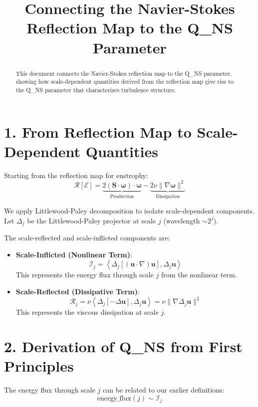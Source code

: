 \documentclass[11pt]{article}
\title{Connecting the Navier-Stokes Reflection Map to the Q_{NS} Parameter}
\author{}
\date{}
\begin{document}
\maketitle
\begin{abstract}
This document connects the Navier-Stokes reflection map to the Q_{NS} parameter, showing how scale-dependent quantities derived from the reflection map give rise to the Q_{NS} parameter that characterizes turbulence structure.
\end{abstract}

\section{1. From Reflection Map to Scale-Dependent Quantities}

Starting from the reflection map for enstrophy:
\[
\mathcal{R}[\mathcal{E}] = \underbrace{2(\mathbf{S} \cdot \boldsymbol{\omega}) \cdot \boldsymbol{\omega}}_{\text{Production}} - \underbrace{2\nu \|\nabla \boldsymbol{\omega}\|^2}_{\text{Dissipation}}
\]

We apply Littlewood-Paley decomposition to isolate scale-dependent components. Let \(\Delta_j\) be the Littlewood-Paley projector at scale \(j\) (wavelength \(\sim 2^j\)).

The scale-reflected and scale-inflicted components are:

\begin{itemize}
\item \textbf{Scale-Inflicted (Nonlinear Term)}:
  \[
  \mathcal{I}_j = \left\langle \Delta_j[(\mathbf{u} \cdot \nabla)\mathbf{u}] , \Delta_j\mathbf{u} \right\rangle
  \]
  This represents the energy flux through scale \(j\) from the nonlinear term.

\item \textbf{Scale-Reflected (Dissipative Term)}:
  \[
  \mathcal{R}_j = \nu \left\langle \Delta_j[-\Delta\mathbf{u}] , \Delta_j\mathbf{u} \right\rangle = \nu \|\nabla \Delta_j\mathbf{u}\|^2
  \]
  This represents the viscous dissipation at scale \(j\).
\end{itemize}

\section{2. Derivation of Q_{NS} from First Principles}

The energy flux through scale \(j\) can be related to our earlier definitions:
\[
\text{energy\_flux}(j) \sim \mathcal{I}_j
\]
\end{document}
